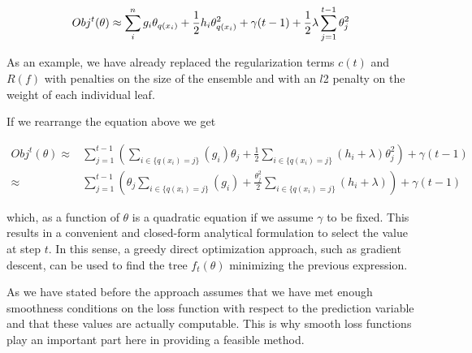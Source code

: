 \begin{appendices}

\begin{equation}\label{eq:gb-objSteps1}
Obj^t(\theta) \approx \sum_i^n {g_i \theta_{q(x_i)} + \frac{1}{2} h_i \theta_{q(x_i)}^2 } + \gamma ({t-1}) + \frac{1}{2}\lambda \sum_{j=1}^{t-1} \theta_j^2 \\
\end{equation}

As an example, we have already replaced the regularization terms $c(t)$ and $R(f)$ with penalties on the size of the ensemble and with an $l$2 penalty on the weight of each individual leaf.

If we rearrange the equation above we get

\begin{equation}\label{eq:gb-objSteps2}
\begin{split}
Obj^t(\theta) \approx & \sum_{j=1}^{t-1} \left( \sum_{i \in \{q(x_i)=j\}} (g_i )\theta_{j} + \frac{1}{2} \sum_{i \in \{q(x_i)=j\}} (h_i + \lambda ) \theta_{j}^2 \right) + \gamma ({t-1}) \\
\approx & \sum_{j=1}^{t-1} \left( \theta_{j}\sum_{i \in \{q(x_i)=j\}} (g_i ) + \frac{\theta_{j}^2}{2} \sum_{i \in \{q(x_i)=j\}} (h_i + \lambda ) \right) + \gamma ({t-1})
\end{split}
\end{equation}

which, as a function of $\theta$ is a quadratic equation if we assume $\gamma$ to be fixed. 
This results in a convenient and closed-form analytical formulation to select the value at step $t$. 
In this sense, a greedy direct optimization approach, such as gradient descent, can be used to find the tree $f_t(\theta)$ minimizing the previous expression.

As we have stated before the approach assumes that we have met enough smoothness conditions on the loss function with respect to the prediction variable and that these values are actually computable. 
This is why smooth loss functions play an important part here in providing a feasible method.






\end{appendices}